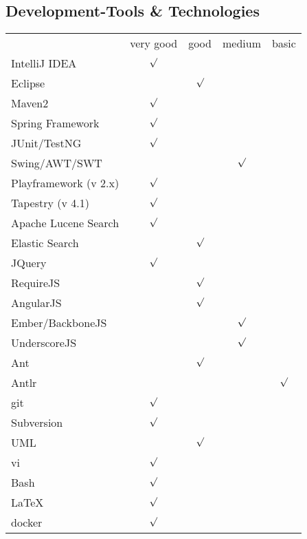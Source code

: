 \documentclass[11pt,a4paper,german]{moderncv}
\begin{document}
\subsection{Development-Tools \& Technologies}
{
\begin{tabular}{l*{4}{c}}
          & very good & good & medium & basic \\
IntelliJ IDEA & $ \surd $ & & & \\
Eclipse &  & $\surd$& &  \\
Maven2 &  $\surd$ & & & \\
Spring Framework &  $\surd$ & & & \\
JUnit/TestNG & $\surd$ & & &  \\
Swing/AWT/SWT & & & $\surd$ &  \\
Playframework (v 2.x)& $ \surd $ & & & \\
Tapestry (v 4.1) & $ \surd $ & & & \\
Apache Lucene Search & $ \surd $ & & & \\
Elastic Search & & $ \surd $ & & \\
JQuery & $ \surd $ & & & \\
RequireJS & & $ \surd $ & & \\
AngularJS & & $ \surd $ & & \\
Ember/BackboneJS & & & $ \surd $ & \\
UnderscoreJS & & & $ \surd $ & \\
Ant & & $\surd$& &  \\
Antlr & & & & $\surd$ \\
git & $\surd$ & & &  \\
Subversion & $\surd$ & & &  \\
UML & & $\surd$& &  \\
vi & $\surd$ &  & & \\
Bash & $\surd$ & & &  \\
\LaTeX & $\surd$ & & & \\
docker & $\surd$ & & & \\
\end{tabular}
}{}




\end{document}
